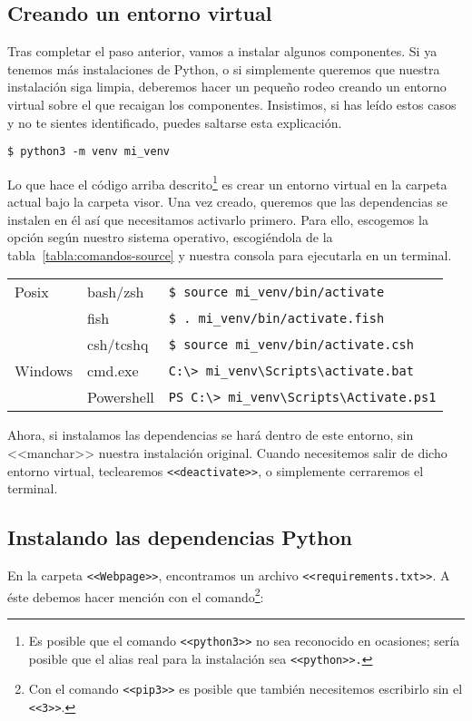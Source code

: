 \subsection{Creando un entorno virtual}\label{crear-venv}
Tras completar el paso anterior, vamos a instalar algunos componentes. Si ya tenemos más instalaciones de Python, o si simplemente queremos que nuestra instalación siga limpia, deberemos hacer un pequeño rodeo creando un  entorno virtual sobre el que recaigan los componentes. Insistimos, si has leído estos casos y no te sientes identificado, puedes saltarse esta explicación.

\noindent\verb|$ python3 -m venv mi_venv|

Lo que hace el código arriba descrito\footnote{Es posible que el comando \texttt{<<python3>>} no sea reconocido en ocasiones; sería posible que el alias real para la instalación sea \texttt{<<python>>.}} es crear un entorno virtual en la carpeta actual bajo la carpeta visor. Una vez creado, queremos que las dependencias se instalen en él así que necesitamos activarlo primero. Para ello, escogemos la opción según nuestro sistema operativo, escogiéndola de la tabla~\ref{tabla:comandos-source} y nuestra consola para ejecutarla en un terminal.

\begin{tabular}{lll}
		\otoprule
	Posix   & bash/zsh   & \verb|$ source mi_venv/bin/activate|          \\
		\cline{2-3}
	& fish       & \verb|$ . mi_venv/bin/activate.fish|          \\
		\cline{2-3}
	& csh/tcshq  & \verb|$ source mi_venv/bin/activate.csh|      \\
	\midrule
	Windows & cmd.exe    & \verb|C:\> mi_venv\Scripts\activate.bat|    \\
		\cline{2-3}
	& Powershell & \verb|PS C:\> mi_venv\Scripts\Activate.ps1| \\
		\bottomrule
\end{tabular}\label{tabla:comandos-source}

Ahora, si instalamos las dependencias se hará dentro de este entorno, sin <<manchar>> nuestra instalación original. Cuando necesitemos salir de dicho entorno virtual, teclearemos \texttt{<<deactivate>>}, o simplemente cerraremos el terminal.



\subsection{Instalando las dependencias Python}\label{instalar-dependencias-python}
En la carpeta \texttt{<<Webpage>>}, encontramos un archivo \texttt{<<requirements.txt>>}. A éste debemos hacer mención con el comando\footnote{Con el comando \texttt{<<pip3>>} es posible que también necesitemos escribirlo sin el \texttt{<<3>>}.}:

